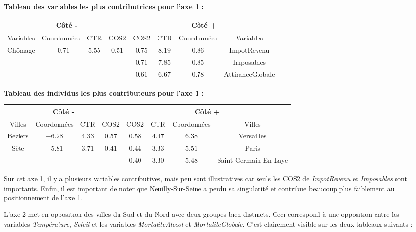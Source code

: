 \documentclass{article}
\begin{document}
\textbf{Tableau des variables les plus contributrices pour l'axe 1 :}
\begin{center}
\begin{tabular}{|c|c|c|c||c|c|c|c|}
\multicolumn{4}{c}{Côté -} & \multicolumn{4}{c}{Côté +}\\
\hline 
Variables & Coordonnées & CTR & COS2 & COS2 & CTR & Coordonnées & Variables \\ 
\hline 
Chômage & $-0.71$ & $5.55$ & $0.51$ & $0.75$ & $8.19$ & $0.86$ & ImpotRevenu  \\ 
\hline 
 &  &  &  & $0.71$ & $7.85$ & $0.85$ & Imposables\\ 
\hline 
 &  &  &  & $0.61$ & $6.67$ & $0.78$ & AttiranceGlobale \\ 
\hline 
\end{tabular} 
\end{center}

\bigskip

\textbf{Tableau des individus les plus contributeurs pour l'axe 1 :}
\begin{center}
\begin{tabular}{|c|c|c|c||c|c|c|c|}
\multicolumn{4}{c}{Côté -} & \multicolumn{4}{c}{Côté +}\\
\hline 
Villes & Coordonnées & CTR & COS2 & COS2 & CTR & Coordonnées & Villes \\ 
\hline 
Beziers & $-6.28$ & $4.33$ & $0.57$ & $0.58$ & $4.47$ & $6.38$ & Versailles \\ 
\hline 
Sète & $-5.81$  & $3.71$ & 0.41 & $0.44$ & $3.33$ & $5.51$ & Paris\\ 
\hline 
 &  &  &  & $0.40$ & $3.30$ & $5.48$ & Saint-Germain-En-Laye \\ 
\hline 
\end{tabular} 
\end{center}

Sur cet axe 1, il y a plusieurs variables contributives, mais peu sont illustratives car seuls les COS2 de \emph{ImpotRevenu} et \emph{Imposables} sont importants. Enfin, il est important de noter que Neuilly-Sur-Seine a perdu sa singularité et contribue beaucoup plus faiblement au positionnement de l'axe 1.

\bigskip

L'axe 2 met en opposition des villes du Sud et du Nord avec deux groupes bien distincts. Ceci correspond à une opposition entre les variables \emph{Température}, \emph{Soleil} et les variables \emph{MortaliteAlcool} et \emph{MortaliteGlobale}. C'est clairement visible sur les deux tableaux suivants : \\
\end{document}

